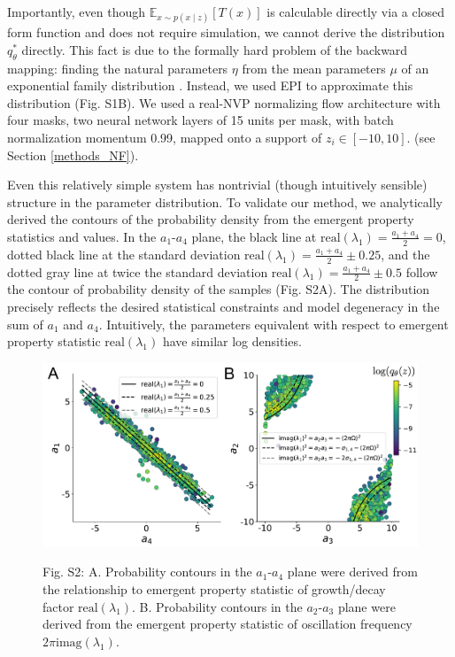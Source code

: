 \documentclass[11pt]{article}
\begin{document}
Importantly, even though $\mathbb{E}_{x\sim p(x \mid z)}\left[T(x)\right]$ is calculable directly via a closed form function and does not require simulation, we cannot derive the distribution $q^*_\theta$ directly.  This fact is due to the formally hard problem of the backward mapping: finding the natural parameters $\eta$ from the mean parameters $\mu$ of an exponential family distribution \cite{wainwright2008graphical}.  Instead, we used EPI to approximate this distribution (Fig. S1B). We used a real-NVP normalizing flow architecture with four masks, two neural network layers of 15 units per mask, with batch normalization momentum 0.99, mapped onto a support of $z_i \in \left[-10, 10 \right]$. (see Section \ref{methods_NF}).

Even this relatively simple system has nontrivial (though intuitively sensible) structure in the parameter distribution.  To validate our method, we analytically derived the contours of the probability density from the emergent property statistics and values.
In the $a_1$-$a_4$ plane, the black line at $\text{real}(\lambda_1) = \frac{a_1 + a_4}{2} = 0$, dotted black line at
the standard deviation $\text{real}(\lambda_1) = \frac{a_1 + a_4}{2} \pm 0.25$, and the dotted gray line at twice the standard deviation
$\text{real}(\lambda_1) = \frac{a_1 + a_4}{2} \pm 0.5$ follow the contour of probability density of the samples (Fig. S2A). The distribution precisely reflects the desired statistical constraints and model degeneracy in the sum of $a_1$ and $a_4$.
 Intuitively, the parameters equivalent with respect to emergent property statistic $\text{real}(\lambda_1)$ have similar log densities.

\begin{figure}
\begin{center}
\includegraphics[scale=0.5]{figures/figS2/figS2.pdf}
\end{center}
\begin{flushleft}
{\small Fig. S2: A. Probability contours in the $a_1$-$a_4$ plane were derived from the relationship to emergent property statistic of growth/decay factor $\text{real}(\lambda_1)$. B. Probability contours in the $a_2$-$a_3$ plane were derived from the emergent property statistic of oscillation frequency $2\pi \text{imag}(\lambda_1)$.}
\end{flushleft}
\end{figure}
\end{document}
